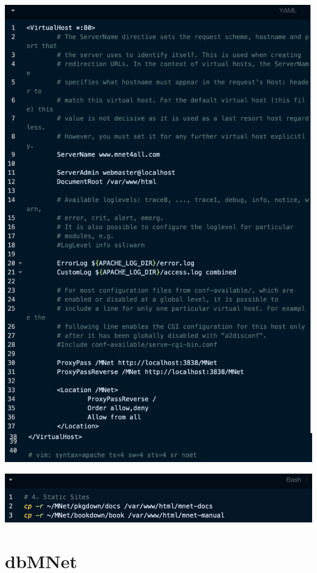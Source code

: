 \documentclass[
]{book}
\begin{document}
\begin{center}\includegraphics[width=47.51in]{figure/3.6.2} \end{center}

\begin{center}\includegraphics[width=1.5\linewidth]{figure/3.6.3} \end{center}

\chapter{dbMNet}\label{dbmnet}
\end{document}
